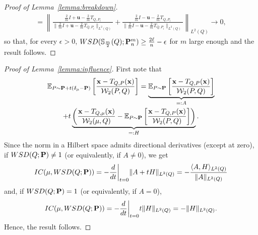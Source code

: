 \documentclass{imsart}
\numberwithin{equation}{section}
\def\E{\mathbb{E}}
\def\x{\mathbf{x}}
\def\u{\mathbf{u}}
\def\E{\mathbb E}
\def\x{\mathbf x}
\begin{document}
\begin{proof}[Proof of Lemma~\ref{lemma:breakdown}]
\begin{multline*}
		= \left\|  \frac{\frac{2}{m}I+ \u -\frac{2}{m}T_{Q, P_i }  }{\| \frac{2}{m}I+ \u -\frac{2}{m}T_{Q, P_i } \|_{L^2(Q)} }+ \frac{\frac{2}{m}I-\u -\frac{2}{m}T_{Q, P_i } }{\| \frac{2}{m}I- \u -\frac{2}{m}T_{Q, P_i } \|_{L^2(Q)}}\right\|_{L^2(Q)} \to 0,
	\end{multline*}
	so that, for every $\epsilon >0$,
	$ \rm WSD(\mathbb{S}_{\frac{m}{2}}(Q); {\bf P}_n^m) \geq  \frac{ 2\ell}{n}  - \epsilon $ for $m$ large enough and the result follows.
\end{proof}

\begin{proof}[Proof of Lemma~\ref{lemma:influence}]
	First note that 
	\begin{multline*}
		\E_{P\sim \mathbf{P}+t (\delta_\mu -{\bf P})}\left[  \frac{\x-T_{Q,P}(\x) }{\mathcal{W}_2(P,Q)}\right]=\underbrace{\E_{P\sim \mathbf{P}}\left[  \frac{\x-T_{Q,P}(\x) }{\mathcal{W}_2(P,Q)}\right]}_{=:A} \\
		+ t \underbrace{\left(  \frac{\x-T_{Q,\mu}(\x) }{\mathcal{W}_2(\mu,Q)}- \E_{P\sim \mathbf{P}}\left[  \frac{\x-T_{Q,P}(\x) }{\mathcal{W}_2(P,Q)}\right] \right)}_{=:H}.
	\end{multline*}
	Since the norm in a Hilbert space admits directional derivatives (except at zero), if  ${\rm WSD}(Q;{\bf P})\neq 1$ (or equivalently, if $A\neq 0$), we get 
	$${\rm IC}( \mu, {\rm WSD}(Q;{\bf P} ))= - \frac{d}{d t } \bigg\vert_{t=0}\|A+ t H\|_{L^2(Q)} =-\frac{\langle A,H\rangle_{L^2(Q)}}{\|A\|_{L^2(Q)}} $$
	and, if ${\rm WSD}(Q;{\bf P})= 1$ (or equivalently, if $A=0$), 
	$${\rm IC}( \mu, {\rm WSD}(Q;{\bf P} ))= - \frac{d}{d t } \bigg\vert_{t=0} t\| H\|_{L^2(Q)} = -\| H\|_{L^2(Q)} .$$
	Hence, the result follows.
\end{proof}
\end{document}
